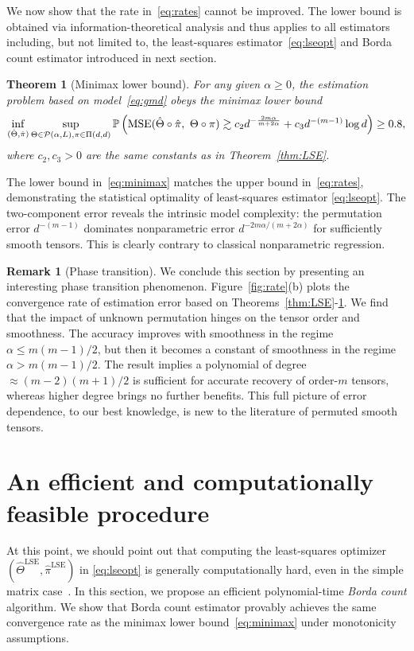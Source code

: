 \documentclass[12pt]{article}
\newtheorem{thm}{Theorem}
\theoremstyle{definition}
\newtheorem{rmk}{Remark}
\begin{document}
We now show that the rate in~\eqref{eq:rates} cannot be improved. The lower bound is obtained via information-theoretical analysis and thus applies to all estimators including, but not limited to, the least-squares estimator~\eqref{eq:lseopt} and Borda count estimator introduced in next section. 
\begin{thm}[Minimax lower bound]\label{thm:minimax}For any given $\alpha\geq 0$, the estimation problem based on model~\eqref{eq:gmd} obeys the minimax lower bound 
\begin{equation}\label{eq:minimax}
\inf_{(\hat \Theta,\hat \pi)}\sup_{
\Theta\in \mathcal{P}(\alpha,L), \pi\in \Pi(d,d)} \mathbb{P}\left(\textup{MSE}(\hat\Theta\circ\hat\pi,\ \Theta\circ\pi) \gtrsim c_2 d^{-{2m\alpha\over m+2\alpha}}+c_3 d^{-(m-1)}\log d \right) \geq 0.8,
\end{equation}
where $c_2,c_3>0$ are the same constants as in Theorem~\ref{thm:LSE}. 
\end{thm}
The lower bound in~\eqref{eq:minimax} matches the upper bound in~\eqref{eq:rates}, demonstrating the statistical optimality of  least-squares estimator \eqref{eq:lseopt}. The two-component error reveals the intrinsic model complexity: the permutation error $d^{-(m-1)}$ dominates nonparametric error $d^{-{2m\alpha/(m+2\alpha)}}$ for sufficiently smooth tensors. This is clearly contrary to classical nonparametric regression. 

\begin{rmk}[Phase transition]\label{rmk:phase} We conclude this section by presenting an interesting phase transition phenomenon.  Figure~\ref{fig:rate}(b) plots the convergence rate of estimation error based on Theorems~\ref{thm:LSE}-\ref{thm:minimax}. We find that the impact of unknown permutation hinges on the tensor order and smoothness.  
The accuracy improves with smoothness in the regime $\alpha\leq m(m-1)/2$, but then it becomes a constant of smoothness in the regime $\alpha>m(m-1)/2$. 
The result implies a polynomial of degree $\approx (m-2)(m+1)/2$ is sufficient for accurate recovery of order-$m$ tensors, whereas higher degree brings no further benefits. This full picture of error dependence, to our best knowledge, is new to the literature of permuted smooth tensors.
\end{rmk}


\section{An efficient and computationally feasible procedure}\label{sec:borda}
At this point, we should point out that computing the least-squares optimizer $(\hat\Theta^{\text{LSE}},\hat\pi^{\text{LSE}})$ in \eqref{eq:lseopt} is generally computationally hard, even in the simple matrix case~\cite{gao2015rate}. In this section, we propose an efficient polynomial-time \emph{Borda count} algorithm. We show that Borda count estimator provably achieves the same convergence rate as the minimax lower bound~\eqref{eq:minimax} under monotonicity assumptions. 
\end{document}
